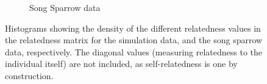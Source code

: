 \begin{figure}
\begin{subfigure}[b]{0.5\textwidth}
    \caption{Song Sparrow data}
    \label{fig:relatedness:realdata}
  \end{subfigure}
  \caption[Off-diagonal values in simulated relatedness matrix]{Histograms showing the density of the different relatedness values in the relatedness matrix for the simulation data, and the song sparrow data, respectively. The diagonal values (measuring relatedness to the individual itself) are not included, as self-relatedness is one by construction.}
  \label{fig:relatedness offdiagonal}
\end{figure}